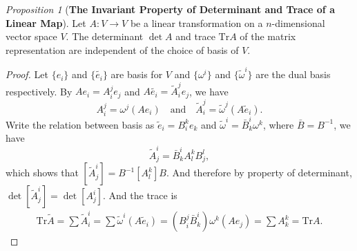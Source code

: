 \documentclass[a4paper]{article}
\theoremstyle{remark}
\newtheorem{prop}{Proposition}
\newcommand\wtilde[1]{\widetilde{#1}} %
\begin{document}
\begin{prop}[\textbf{The Invariant Property of Determinant and Trace of a Linear Map}]
Let $A : V \to V$ be a linear transformation on a $n$-dimensional vector space $V$. The determinant $\det A$ and trace $\text{Tr} A$ of the matrix representation are independent of the choice of basis of $V$.
\end{prop}
\begin{proof}
Let $\{e_i\}$ and $\{\wtilde{e_i} \}$ are basis for $V$ and $\{\omega^i\}$ and $\{\wtilde{\omega}^i\}$ are the dual basis respectively. By $Ae_i = A_i^j e_j$ and $A\wtilde{e_i} = \wtilde{A}_i^je_j$, we have
$$
A_i^j = \omega^j(Ae_i) \quad \text{and} \quad \wtilde{A}_i^j = \wtilde{\omega}^j(A\wtilde{e}_i).
$$
Write the relation between basis as $\wtilde{e}_i = B_i^k e_k$ and $\wtilde{\omega}^i = \bar{B}^i_k\omega^k$, where $\bar{B} = B^{-1}$, we have
$$
\wtilde{A}^i_j = \bar{B}^i_k  A^k_l B_j^l,
$$
which shows that $[\wtilde{A}^i_j] = B^{-1} [A^k_l] B$. And therefore by property of determinant, $\det [\wtilde{A}^i_j] = \det [A^i_j]$. And the trace is
\begin{align*}
\text{Tr} \wtilde{A} = \sum \wtilde{A}^i_i = \sum \wtilde{\omega}^i(A\wtilde{e}_i) = (B_i^j \bar{B}^i_k) \omega^k (Ae_j) = \sum A^k_k = \text{Tr} A.
\end{align*}
\end{proof}
\end{document}
